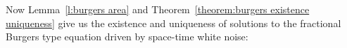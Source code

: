 \documentclass[11pt,a4paper]{article}
\theoremstyle{remark}
\newtheorem{remark}[theorem]{Remark}
\newcommand{\N}{\mathbb{N}}
\begin{document}
%   

Now Lemma~\ref{l:burgers area} and Theorem~\ref{theorem:burgers existence uniqueness} give us the existence and uniqueness of solutions to the fractional Burgers type equation driven by space-time white noise:
\end{document}
